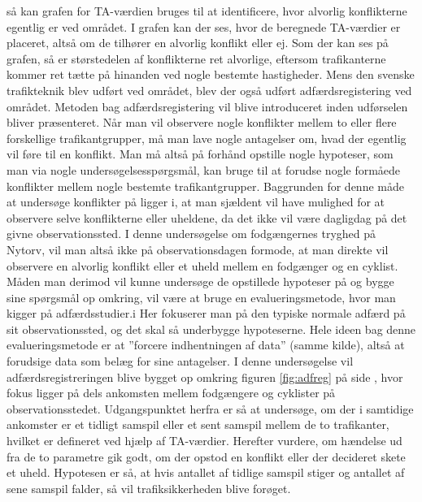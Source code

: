 så kan grafen for TA-værdien bruges til at identificere, hvor alvorlig konflikterne egentlig er ved området. I grafen kan der ses, hvor de beregnede TA-værdier er placeret, altså om de tilhører en alvorlig konflikt eller ej.
Som der kan ses på grafen, så er størstedelen af konflikterne ret alvorlige, eftersom trafikanterne kommer ret tætte på hinanden ved nogle bestemte hastigheder.
Mens den svenske trafikteknik blev udført ved området, blev der også udført adfærdsregistering ved området. Metoden bag adfærdsregistering vil blive introduceret inden udførselen bliver præsenteret.
Når	man	vil	observere nogle	konflikter mellem to eller flere	forskellige trafikantgrupper,	må man lave	nogle antagelser	om, hvad	 der egentlig vil føre til en konflikt. Man må altså	på	forhånd	opstille nogle hypoteser, som man via nogle undersøgelsesspørgsmål, kan bruge til	at forudse nogle	formåede	konflikter mellem nogle bestemte	trafikantgrupper.	Baggrunden for denne	måde at	undersøge konflikter	på ligger i,	at man sjældent 	vil	have	mulighed	 for at	observere selve konflikterne	eller uheldene, da det ikke	vil	være	 dagligdag på	 det	 givne observationssted.	I denne	undersøgelse om	fodgængernes tryghed på	Nytorv,	vil man altså ikke på observationsdagen formode,	at man direkte vil observere en alvorlig	 konflikt eller	et uheld mellem	en fodgænger og	en cyklist.	Måden man derimod	vil	kunne undersøge	de opstillede hypoteser på og bygge sine	spørgsmål op omkring, vil	være	at bruge en	evalueringsmetode, hvor	man	kigger på adfærdsstudier.i Her fokuserer	man	på den typiske normale adfærd på	sit observationssted, og	det skal så	underbygge	hypoteserne. Hele ideen bag denne evalueringsmetode er at ”forcere indhentningen af data”	(samme	kilde),	altså at forudsige data	som	belæg for sine antagelser.
I denne undersøgelse vil	adfærdsregistreringen blive bygget op omkring	figuren \cref{fig:adfreg} på side \pageref{fig:adfreg},
hvor fokus ligger på dels ankomsten mellem fodgængere	 og cyklister på observationsstedet. Udgangspunktet herfra er så at	undersøge, om	der i samtidige ankomster er et tidligt samspil eller	et sent samspil mellem de to trafikanter, hvilket er defineret ved hjælp af TA-værdier.
Herefter vurdere, om hændelse ud fra	de to parametre gik godt, om	der	opstod en konflikt	eller der decideret skete et	uheld. Hypotesen er	så,	at hvis	antallet af	tidlige samspil stiger og antallet af sene samspil falder, så vil trafiksikkerheden blive forøget.
